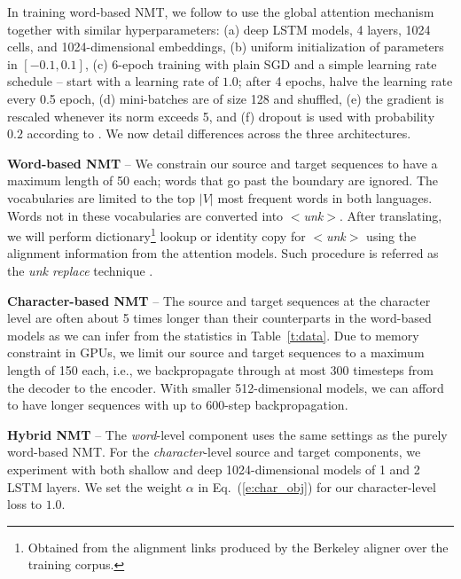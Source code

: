 \documentclass[11pt]{article}
\newcommand{\eq}[1]{Eq.~(\ref{#1})}
\newcommand{\unk}{$<${\it unk}$>$}
\begin{document}
In training word-based NMT, we follow  to use the global attention mechanism together with
similar hyperparameters: (a) deep LSTM models, 4 layers, 1024
cells, and 1024-dimensional embeddings, (b) uniform initialization of
parameters in $[-0.1, 0.1]$, (c) 6-epoch training with plain SGD and a simple learning
rate schedule -- start with a learning rate of $1.0$; after 4 epochs,
halve the learning rate every 0.5 epoch, (d) mini-batches are of
size 128 and shuffled, (e) the gradient is rescaled whenever its norm exceeds 5, and (f)
dropout is used with probability $0.2$ according to 
\cite{pham2014dropout}.
We now detail differences across the three architectures.


{\bf Word-based NMT} -- We constrain our source and target sequences to
have a maximum length of 50 each; words that go past the boundary are ignored.
The vocabularies are limited to the top $|V|$ most %
frequent words in both languages. Words not in these vocabularies
are converted into \unk{}. After translating, we will perform
dictionary\footnote{Obtained from the alignment links produced by the Berkeley
aligner \cite{liang06alignment} over
the training corpus.} lookup or
identity copy for \unk{} using the alignment information from the
attention models. Such procedure is referred as the {\it unk replace}
technique \cite{luong15,jean15}.

{\bf Character-based NMT} -- The source and
target sequences at the character level are often about 5 times longer than their counterparts in the
word-based models as we can infer from the statistics in
Table~\ref{t:data}. Due to memory constraint in GPUs, we limit our source and
target sequences to a maximum length of 150 each, i.e., we backpropagate
through at most 300 timesteps from the decoder to the encoder. With
smaller 512-dimensional models, we can afford to have longer sequences with up
to 600-step backpropagation. 

{\bf Hybrid NMT} -- The {\it word}-level component uses the
same settings as the purely word-based NMT. For the {\it character}-level source
and target components, we experiment with both shallow and deep 1024-dimensional models of
1 and 2 LSTM layers. 
We
set the weight $\alpha$ in \eq{e:char_obj} for our character-level loss to
$1.0$.
\end{document}

